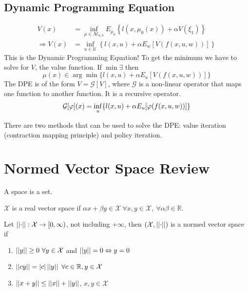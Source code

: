 \subsection{Dynamic Programming Equation}
\begin{align}
V(x) &= \inf_{\mu\in\mathcal{M}_{0,0}} E_{\mu_0} \left\lbrace l(x,\mu_0(x)) + \alpha V(\xi_1) \right\rbrace \nonumber \\
\Rightarrow V(x) &= \inf_{u\in\mathcal{U}} \left\lbrace l(x,u) + \alpha E_w[V(f(x,u,w))] \right\rbrace
\end{align}
This is the Dynamic Programming Equation! To get the minimum we have to solve for $V$, the value function.
If $\min\exists$ then
$$\mu(x)\in\arg\min\{l(x,u)+\alpha E_u[V(f(x,u,w))]\}$$
The DPE is of the form $V=\mathcal{G}[V]$, where $\mathcal{G}$ is a non-linear operator that maps one function to another function.
It is a recursive operator.
$$\mathcal{G}[\varphi](x) = \inf_u\{l(x,u)+\alpha E_u[\varphi(f(x,u,w))]\}$$

There are two methods that can be used to solve the DPE\@: value iteration (contraction mapping principle) and policy iteration.

\section{Normed Vector Space Review}
\label{sec:normedvectorspace}
\begin{definition}
A space is a set.
\end{definition}

\begin{definition}
$\mathcal{X}$ is a real vector space if $\alpha x+\beta y\in\mathcal{X}~\forall x,y\in\mathcal{X},~\forall \alpha\beta\in\mathbb{R}$.
\end{definition}

\begin{definition}
Let $\left|\left|\cdot\right|\right|: \mathcal{X}\to[0,\infty)$, not including $+\infty$, then $(\mathcal{X},\left|\left|\cdot\right|\right|)$ is a normed vector space if%
\begin{enumerate}
\item $\left|\left|y\right|\right|\geq0~\forall y\in\mathcal{X}$ and $\left|\left|y\right|\right|=0\Leftrightarrow y=0$
\item $||cy|| = |c|\left|\left|y\right|\right|~\forall c\in\mathbb{R}, y\in\mathcal{X}$
\item $\left|\left|x+y\right|\right|\leq ||x|| + ||y||$, $x,y\in\mathcal{X}$
\end{enumerate}
\end{definition}

